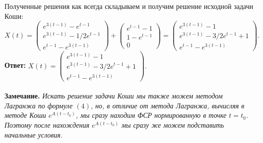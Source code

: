 \documentclass[a4paper, 12pt]{article}
\begin{document}
Полученные решения как всегда складываем и получим решение исходной задачи Коши:
$$X(t) = \begin{pmatrix}
	e^{3(t-1)} - e^{t-1}\\
	e^{3(t-1)} - 1/2e^{t-1}\\
	e^{t-1} - e^{3(t-1)}
\end{pmatrix} + \begin{pmatrix}
e^{t-1} - 1\\
1 - e^{t-1}\\
0
\end{pmatrix} = \begin{pmatrix}
	e^{3(t-1)} - 1\\
	e^{3(t-1)} - 3/2e^{t-1} + 1\\
	e^{t-1} - e^{3(t-1)}
\end{pmatrix}.$$
\textbf{Ответ:} $X(t) = \begin{pmatrix}
	e^{3(t-1)} - 1\\
	e^{3(t-1)} - 3/2e^{t-1} + 1\\
	e^{t-1} - e^{3(t-1)}
\end{pmatrix}.$\\\\
\textbf{Замечание.} \textit{Искать решение задачи Коши мы также можем методом Лагранжа по формуле $(4)$, но, в отличие от метода Лагранжа, вычисляя в методе Коши $e^{A(t-t_0)}$, мы сразу находим ФСР нормированную в точке $t=t_0$. Поэтому после нахождения $e^{A(t-t_0)}$ мы сразу же можем подставить начальные условия.} 
\end{document}
